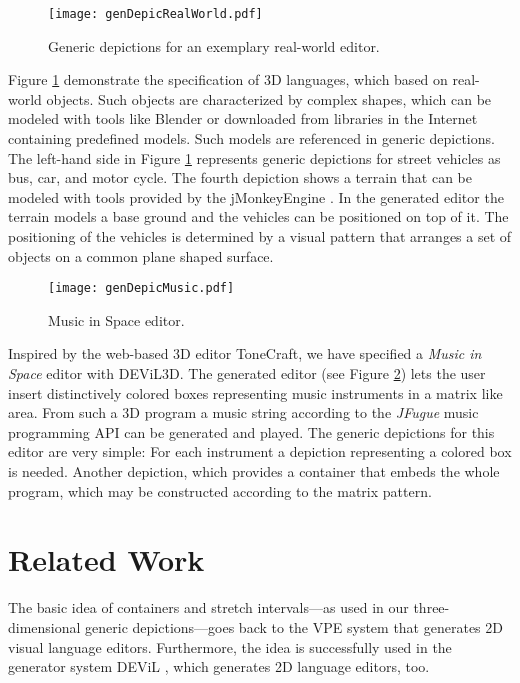 \documentclass[a4paper]{article}
\newcommand{\dev}{DEViL3D\xspace}
\begin{document}
\begin{figure}[!ht]
  \centering
  \texttt{[image: genDepicRealWorld.pdf]}
  \caption{Generic depictions for an exemplary real-world editor.}
  \label{fig:realWorld}
\end{figure}


Figure \ref{fig:realWorld} demonstrate the specification of 3D languages, which based on real-world objects. Such objects are characterized by complex shapes, which can be modeled with tools like Blender \cite{Blender} or downloaded from libraries in the Internet containing predefined models. Such models are referenced in generic depictions. The left-hand side in Figure \ref{fig:realWorld} represents generic depictions for street vehicles as bus, car, and motor cycle. The fourth depiction shows a terrain that can be modeled with tools provided by the jMonkeyEngine \cite{jme}. In the generated editor the terrain models a base ground and the vehicles can be positioned on top of it. The positioning of the vehicles is determined by a visual pattern that arranges a set of objects on a common plane shaped surface.

\begin{figure}[!ht]
  \centering
  \texttt{[image: genDepicMusic.pdf]}
  \caption{Music in Space editor.}
  \label{fig:music}
\end{figure}

Inspired by the web-based 3D editor ToneCraft, we have specified a \emph{Music in Space} editor with \dev. The generated editor (see Figure \ref{fig:music}) lets the user insert distinctively colored boxes representing music instruments in a matrix like area. From such a 3D program a music string according to the \emph{JFugue} music programming API \cite{jfugue} can be generated and played. The generic depictions for this editor are very simple: For each instrument a depiction representing a colored box is needed. Another depiction, which provides a container that embeds the whole program, which may be constructed according to the matrix pattern.





\section{Related Work}
\label{sec:relWork}
The basic idea of containers and stretch intervals---as used in our three-dimensional generic depictions---goes back to the VPE system \cite{Gra98} that generates 2D visual language editors. Furthermore, the idea is successfully used in the generator system DEViL \cite{SKC06}, which generates 2D language editors, too.
\end{document}
